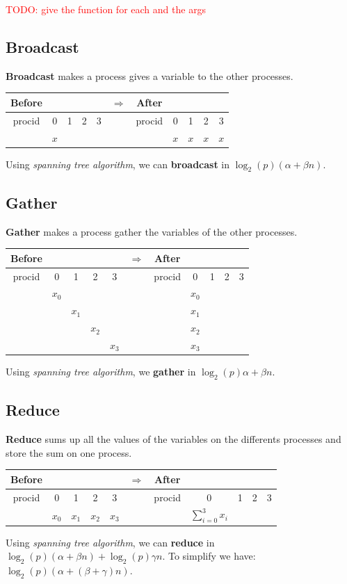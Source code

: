 \documentclass[12pt, openany]{report}
\theoremstyle{definition}
\begin{document}
\textcolor{red}{TODO: give the function for each and the args}
\subsection{Broadcast}
\textbf{Broadcast} makes a process gives a variable to the other processes.\\
\begin{center}
	\begin{tabular}{ccccc|c|ccccc}
		Before &&&&& $\Longrightarrow$ &After&&&&\\
		\hline
		procid & 0 & 1 & 2 & 3 & & procid & 0 & 1 & 2 & 3\\
		\hline
		& $x$ &&&&& & $x$ & $x$ & $x$ & $x$\\
		\hline
	\end{tabular}
\end{center}
Using \textit{spanning tree algorithm}, we can \textbf{broadcast} in $\log_2(p)(\alpha + \beta n)$.
\subsection{Gather}
\textbf{Gather} makes a process gather the variables of the other processes.\\
\begin{center}
	\begin{tabular}{ccccc|c|ccccc}
		Before &&&&& $\Longrightarrow$ &After&&&&\\
		\hline
		procid & 0 & 1 & 2 & 3 & & procid & 0 & 1 & 2 & 3\\
		\hline
		& $x_0$ &&&&& & $x_0$ &&&\\
		&& $x_1$ &&&& & $x_1$ &&&\\
		&&& $x_2$ &&& & $x_2$ &&&\\
		&&&& $x_3$ && & $x_3$ &&&\\
		\hline
	\end{tabular}
\end{center}
Using \textit{spanning tree algorithm}, we \textbf{gather} in $\log_2(p)\alpha + \beta n$.
\subsection{Reduce}
\textbf{Reduce} sums up all the values of the variables on the differents processes and store the sum on one process.\\
\begin{center}
	\begin{tabular}{ccccc|c|ccccc}
		Before &&&&& $\Longrightarrow$ &After&&&&\\
		\hline
		procid & 0 & 1 & 2 & 3 & & procid & 0 & 1 & 2 & 3\\
		\hline
		& $x_0$ & $x_1$ & $x_2$ & $x_3$ && & $\displaystyle \sum_{i=0}^{3} x_i$ &&&\\
		\hline
	\end{tabular}
\end{center}
Using \textit{spanning tree algorithm}, we can \textbf{reduce} in $\log_2(p)(\alpha + \beta n) + \log_2(p) \gamma n$. To simplify we have: $\log_2(p)(\alpha + (\beta + \gamma) n)$.
\end{document}

